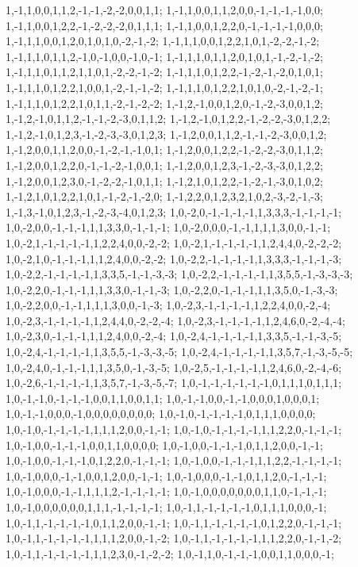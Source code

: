 {{1,-1,1,0,0,1,1,2,-1,-1,-2,-2,0,0,1,1; 1,-1,1,0,0,1,1,2,0,0,-1,-1,-1,-1,0,0; 1,-1,1,0,0,1,2,2,-1,-2,-2,-2,0,1,1,1; 1,-1,1,0,0,1,2,2,0,-1,-1,-1,-1,0,0,0; 1,-1,1,1,0,0,1,2,0,1,0,1,0,-2,-1,-2; 1,-1,1,1,0,0,1,2,2,1,0,1,-2,-2,-1,-2; 1,-1,1,1,0,1,1,2,-1,0,-1,0,0,-1,0,-1; 1,-1,1,1,0,1,1,2,0,1,0,1,-1,-2,-1,-2; 1,-1,1,1,0,1,1,2,1,1,0,1,-2,-2,-1,-2; 1,-1,1,1,0,1,2,2,-1,-2,-1,-2,0,1,0,1; 1,-1,1,1,0,1,2,2,1,0,0,1,-2,-1,-1,-2; 1,-1,1,1,0,1,2,2,1,0,1,0,-2,-1,-2,-1;
1,-1,1,1,0,1,2,2,1,0,1,1,-2,-1,-2,-2; 1,-1,2,-1,0,0,1,2,0,-1,-2,-3,0,0,1,2; 1,-1,2,-1,0,1,1,2,-1,-1,-2,-3,0,1,1,2; 1,-1,2,-1,0,1,2,2,-1,-2,-2,-3,0,1,2,2; 1,-1,2,-1,0,1,2,3,-1,-2,-3,-3,0,1,2,3; 1,-1,2,0,0,1,1,2,-1,-1,-2,-3,0,0,1,2; 1,-1,2,0,0,1,1,2,0,0,-1,-2,-1,-1,0,1; 1,-1,2,0,0,1,2,2,-1,-2,-2,-3,0,1,1,2; 1,-1,2,0,0,1,2,2,0,-1,-1,-2,-1,0,0,1; 1,-1,2,0,0,1,2,3,-1,-2,-3,-3,0,1,2,2; 1,-1,2,0,0,1,2,3,0,-1,-2,-2,-1,0,1,1; 1,-1,2,1,0,1,2,2,-1,-2,-1,-3,0,1,0,2;
1,-1,2,1,0,1,2,2,1,0,1,-1,-2,-1,-2,0; 1,-1,2,2,0,1,2,3,2,1,0,2,-3,-2,-1,-3; 1,-1,3,-1,0,1,2,3,-1,-2,-3,-4,0,1,2,3; 1,0,-2,0,-1,-1,-1,-1,1,3,3,3,-1,-1,-1,-1; 1,0,-2,0,0,-1,-1,-1,1,1,3,3,0,-1,-1,-1; 1,0,-2,0,0,0,-1,-1,1,1,1,3,0,0,-1,-1; 1,0,-2,1,-1,-1,-1,-1,1,2,2,4,0,0,-2,-2; 1,0,-2,1,-1,-1,-1,-1,1,2,4,4,0,-2,-2,-2; 1,0,-2,1,0,-1,-1,-1,1,1,2,4,0,0,-2,-2; 1,0,-2,2,-1,-1,-1,-1,1,3,3,3,-1,-1,-1,-3; 1,0,-2,2,-1,-1,-1,-1,1,3,3,5,-1,-1,-3,-3; 1,0,-2,2,-1,-1,-1,-1,1,3,5,5,-1,-3,-3,-3;
1,0,-2,2,0,-1,-1,-1,1,1,3,3,0,-1,-1,-3; 1,0,-2,2,0,-1,-1,-1,1,1,3,5,0,-1,-3,-3; 1,0,-2,2,0,0,-1,-1,1,1,1,3,0,0,-1,-3; 1,0,-2,3,-1,-1,-1,-1,1,2,2,4,0,0,-2,-4; 1,0,-2,3,-1,-1,-1,-1,1,2,4,4,0,-2,-2,-4; 1,0,-2,3,-1,-1,-1,-1,1,2,4,6,0,-2,-4,-4; 1,0,-2,3,0,-1,-1,-1,1,1,2,4,0,0,-2,-4; 1,0,-2,4,-1,-1,-1,-1,1,3,3,5,-1,-1,-3,-5; 1,0,-2,4,-1,-1,-1,-1,1,3,5,5,-1,-3,-3,-5; 1,0,-2,4,-1,-1,-1,-1,1,3,5,7,-1,-3,-5,-5; 1,0,-2,4,0,-1,-1,-1,1,1,3,5,0,-1,-3,-5; 1,0,-2,5,-1,-1,-1,-1,1,2,4,6,0,-2,-4,-6;
1,0,-2,6,-1,-1,-1,-1,1,3,5,7,-1,-3,-5,-7; 1,0,-1,-1,-1,-1,-1,-1,0,1,1,1,0,1,1,1; 1,0,-1,-1,0,-1,-1,-1,0,0,1,1,0,0,1,1; 1,0,-1,-1,0,0,-1,-1,0,0,0,1,0,0,0,1; 1,0,-1,-1,0,0,0,-1,0,0,0,0,0,0,0,0; 1,0,-1,0,-1,-1,-1,-1,0,1,1,1,0,0,0,0; 1,0,-1,0,-1,-1,-1,-1,1,1,1,2,0,0,-1,-1; 1,0,-1,0,-1,-1,-1,-1,1,1,2,2,0,-1,-1,-1; 1,0,-1,0,0,-1,-1,-1,0,0,1,1,0,0,0,0; 1,0,-1,0,0,-1,-1,-1,0,1,1,2,0,0,-1,-1; 1,0,-1,0,0,-1,-1,-1,0,1,2,2,0,-1,-1,-1; 1,0,-1,0,0,-1,-1,-1,1,1,2,2,-1,-1,-1,-1;
1,0,-1,0,0,0,-1,-1,0,0,1,2,0,0,-1,-1; 1,0,-1,0,0,0,-1,-1,0,1,1,2,0,-1,-1,-1; 1,0,-1,0,0,0,-1,-1,1,1,1,2,-1,-1,-1,-1; 1,0,-1,0,0,0,0,0,0,0,1,1,0,-1,-1,-1; 1,0,-1,0,0,0,0,0,0,1,1,1,-1,-1,-1,-1; 1,0,-1,1,-1,-1,-1,-1,0,1,1,1,0,0,0,-1; 1,0,-1,1,-1,-1,-1,-1,0,1,1,2,0,0,-1,-1; 1,0,-1,1,-1,-1,-1,-1,0,1,2,2,0,-1,-1,-1; 1,0,-1,1,-1,-1,-1,-1,1,1,1,2,0,0,-1,-2; 1,0,-1,1,-1,-1,-1,-1,1,1,2,2,0,-1,-1,-2; 1,0,-1,1,-1,-1,-1,-1,1,1,2,3,0,-1,-2,-2; 1,0,-1,1,0,-1,-1,-1,0,0,1,1,0,0,0,-1;
}}
